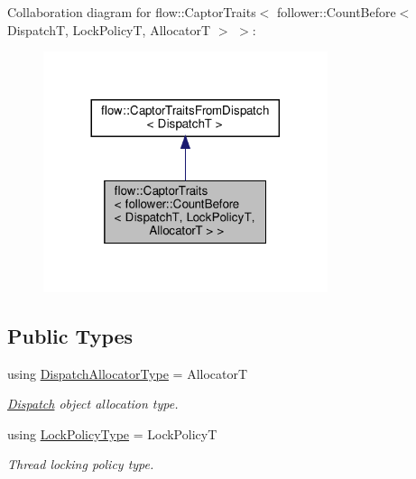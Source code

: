 Collaboration diagram for flow\+:\+:Captor\+Traits$<$ follower\+:\+:Count\+Before$<$ DispatchT, Lock\+PolicyT, AllocatorT $>$ $>$\+:\nopagebreak
\begin{figure}[H]
\begin{center}
\leavevmode
\includegraphics[width=236pt]{structflow_1_1_captor_traits_3_01follower_1_1_count_before_3_01_dispatch_t_00_01_lock_policy_t_00411fc9673f8d978122242ebff5dfa20}
\end{center}
\end{figure}
\subsection*{Public Types}
\begin{DoxyCompactItemize}
\item 
\mbox{\label{structflow_1_1_captor_traits_3_01follower_1_1_count_before_3_01_dispatch_t_00_01_lock_policy_t_00_01_allocator_t_01_4_01_4_a0256fd622c856b65e939e0f3ff5e2cbd}} 
using \hyperlink{structflow_1_1_captor_traits_3_01follower_1_1_count_before_3_01_dispatch_t_00_01_lock_policy_t_00_01_allocator_t_01_4_01_4_a0256fd622c856b65e939e0f3ff5e2cbd}{Dispatch\+Allocator\+Type} = AllocatorT
\begin{DoxyCompactList}\small\item\em \hyperlink{classflow_1_1_dispatch}{Dispatch} object allocation type. \end{DoxyCompactList}\item 
\mbox{\label{structflow_1_1_captor_traits_3_01follower_1_1_count_before_3_01_dispatch_t_00_01_lock_policy_t_00_01_allocator_t_01_4_01_4_af325b004a4e6e21dda30e2474f5cb4a8}} 
using \hyperlink{structflow_1_1_captor_traits_3_01follower_1_1_count_before_3_01_dispatch_t_00_01_lock_policy_t_00_01_allocator_t_01_4_01_4_af325b004a4e6e21dda30e2474f5cb4a8}{Lock\+Policy\+Type} = Lock\+PolicyT
\begin{DoxyCompactList}\small\item\em Thread locking policy type. \end{DoxyCompactList}\end{DoxyCompactItemize}


